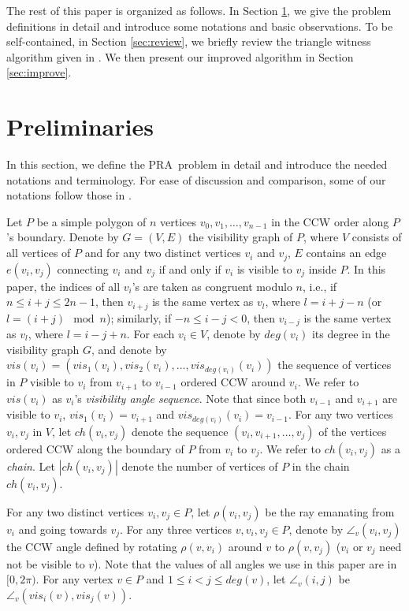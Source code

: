 \documentclass[11pt]{article}
\def\pra{PRA}
\def\sectionspace{\vspace*{0in}}
\begin{document}
The rest of this paper is organized as follows. In Section \ref{sec:pre}, we 
give the problem definitions in detail and
introduce some notations and basic observations. 
To be self-contained, in Section \ref{sec:review}, we briefly review the
triangle witness algorithm given in \cite{ref:DisserRe10}. 
We then present our improved algorithm in Section \ref{sec:improve}. 

\sectionspace
\section{Preliminaries}
\label{sec:pre}
In this section, we define the \pra\ problem in detail and introduce
the needed notations and terminology. For ease of discussion and comparison, some of our
notations follow those in \cite{ref:DisserRe10}. 

Let $P$ be a simple polygon of $n$ vertices $v_0,v_1,\ldots,v_{n-1}$ in the CCW
order along $P$'s boundary. Denote by $G=(V,E)$ the visibility graph
of $P$, where $V$ consists of all vertices of $P$ and for any two distinct
vertices $v_i$ and $v_j$, $E$ contains an edge $e(v_i,v_j)$ connecting $v_i$ and
$v_j$ if and only if $v_i$ is visible to $v_j$ inside $P$. In this
paper, the indices of all $v_i$'s are taken as congruent modulo $n$,
i.e., if $n\leq i+j\leq 2n-1$, then $v_{i+j}$ is the same vertex as $v_l$, where
$l= i+j - n$ (or $l= (i+j) \mod n$); similarly, if $-n \leq i-j<0$, then $v_{i-j}$ is the same
vertex as $v_l$, where $l=i-j+n$. For each $v_i\in V$,
denote by $deg(v_i)$ its degree in the visibility graph $G$, and denote by
$vis(v_i)=(vis_1(v_i),vis_2(v_i),\ldots,vis_{deg(v_i)}(v_i))$ 
the sequence of vertices in $P$ visible to $v_i$ from $v_{i+1}$ to
$v_{i-1}$ ordered CCW around $v_i$. We refer to $vis(v_i)$ as $v_i$'s
{\em visibility angle sequence}. 
Note that since both $v_{i-1}$ and $v_{i+1}$ are visible to $v_i$, 
$vis_1(v_{i}) = v_{i+1}$
and $vis_{deg(v_i)}(v_i) = v_{i-1}$. For any two vertices $v_i,v_j$ in
$V$, let $ch(v_i,v_j)$ denote the sequence
$(v_i,v_{i+1},\ldots,v_j)$ of the vertices ordered CCW along the
boundary of $P$ from $v_i$ to $v_j$. We refer to
$ch(v_i,v_j)$ as a {\em chain}. Let $|ch(v_i,v_j)|$ denote the
number of vertices of $P$ in the chain $ch(v_i,v_j)$. 


For any two distinct vertices $v_i,v_j \in P$, let $\rho(v_i,v_j)$ be the ray emanating from
$v_i$ and going towards $v_j$. For any three vertices $v,v_i,v_j\in P$, denote by
$\angle_v(v_i,v_j)$ the CCW angle defined by rotating
$\rho(v,v_i)$ around $v$ to $\rho(v,v_j)$ ($v_i$ or $v_j$ need not be
visible to $v$). Note that the values
of all angles we use in this paper are in $[0,2\pi)$. For any
vertex $v\in P$ and $1\leq i< j\leq deg(v)$, let $\angle_v(i,j)$ be
$\angle_v(vis_i(v),vis_j(v))$. 
\end{document}
